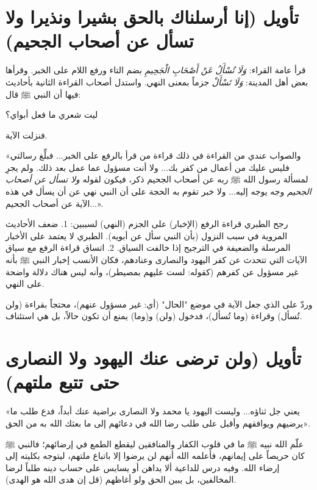 \section{تأويل (إنا أرسلناك بالحق بشيرا ونذيرا ولا تسأل عن أصحاب الجحيم)}
قرأ عامة القراء: \textit{وَلَا تُسْأَلُ عَنْ أَصْحَابِ الْجَحِيمِ} بضم التاء ورفع اللام على الخبر. وقرأها بعض أهل المدينة: \textit{وَلَا تَسْأَلْ} جزماً بمعنى النهي.
واستدل أصحاب القراءة الثانية بأحاديث فيها أن النبي ﷺ قال: \begin{hadith}ليت شعري ما فعل أبواي؟\end{hadith} فنزلت الآية.

 «والصواب عندي من القراءة في ذلك قراءة من قرأ بالرفع على الخبر... فبلِّغ رسالتي فليس عليك من أعمال من كفر بك... ولا أنت مسؤول عما عمل بعد ذلك. ولم يجرِ لمسألة رسول الله ﷺ ربه عن أصحاب الجحيم ذكر، فيكون لقوله \textit{ولا تسأل عن أصحاب الجحيم} وجه يوجه إليه... ولا خبر تقوم به الحجة على أن النبي نهي عن أن يسأل في هذه الآية عن أصحاب الجحيم...».

\begin{fawaid}
رجح الطبري قراءة الرفع (الإخبار) على الجزم (النهي) لسببين:
1. ضعف الأحاديث المروية في سبب النزول (بأن النبي سأل عن أبويه). الطبري لا يعتمد على الأخبار المرسلة والضعيفة في الترجيح إذا خالفت السياق.
2. اتساق قراءة الرفع مع سياق الآيات التي تتحدث عن كفر اليهود والنصارى وعنادهم، فكان الأنسب إخبار النبي ﷺ بأنه غير مسؤول عن كفرهم (كقوله: لست عليهم بمصيطر)، وأنه ليس هناك دلالة واضحة على النهي.
\end{fawaid}

وردّ  على  الذي جعل الآية في موضع "الحال" (أي: غير مسؤول عنهم)، محتجاً بقراءة  (ولن تُسأل) وقراءة  (وما تُسأل)، فدخول (ولن) و(وما) يمنع أن تكون حالاً، بل هي استئناف.

\separator

\section{تأويل (ولن ترضى عنك اليهود ولا النصارى حتى تتبع ملتهم)}
 «يعني جل ثناؤه... وليست اليهود يا محمد ولا النصارى براضية عنك أبداً، فدع طلب ما يرضيهم ويوافقهم وأقبل على طلب رضا الله في دعائهم إلى ما بعثك الله به من الحق».

\begin{fawaid}
علّم الله نبيه ﷺ ما في قلوب الكفار والمنافقين ليقطع الطمع في إرضائهم؛ فالنبي ﷺ كان حريصاً على إيمانهم، فأعلمه الله أنهم لن يرضوا إلا باتباع ملتهم، ليتوجه بكليته إلى إرضاء الله. وفيه درس للداعية ألا يداهن أو يسايس على حساب دينه طلباً لرضا المخالفين، بل يبين الحق ولو أغاظهم (قل إن هدى الله هو الهدى).
\end{fawaid}

